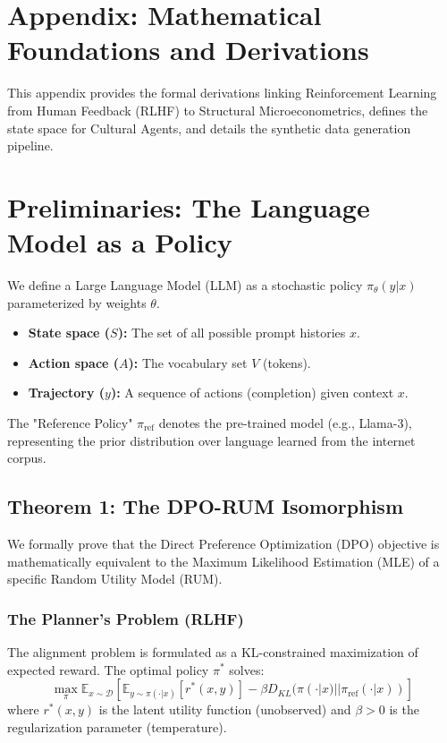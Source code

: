 \section*{Appendix: Mathematical Foundations and Derivations}

\noindent This appendix provides the formal derivations linking Reinforcement Learning from Human Feedback (RLHF) to Structural Microeconometrics, defines the state space for Cultural Agents, and details the synthetic data generation pipeline.

\section{Preliminaries: The Language Model as a Policy}
\label{app:gemini}

\renewcommand{\thesubsection}{\Alph{section}.\arabic{subsection}}
\setcounter{section}{1} %

We define a Large Language Model (LLM) as a stochastic policy $\pi_\theta(y|x)$ parameterized by weights $\theta$.
\begin{itemize}
    \item \textbf{State space ($S$):} The set of all possible prompt histories $x$.
    \item \textbf{Action space ($A$):} The vocabulary set $V$ (tokens).
    \item \textbf{Trajectory ($y$):} A sequence of actions (completion) given context $x$.
\end{itemize}
The "Reference Policy" $\pi_{\text{ref}}$ denotes the pre-trained model (e.g., Llama-3), representing the prior distribution over language learned from the internet corpus.

\subsection{Theorem 1: The DPO-RUM Isomorphism}
\label{proof:dpo_rum}

We formally prove that the Direct Preference Optimization (DPO) objective is mathematically equivalent to the Maximum Likelihood Estimation (MLE) of a specific Random Utility Model (RUM).

\subsubsection{The Planner's Problem (RLHF)}
The alignment problem is formulated as a KL-constrained maximization of expected reward. The optimal policy $\pi^*$ solves:
\begin{equation}
    \max_{\pi} \mathbb{E}_{x \sim \mathcal{D}} \left[ \mathbb{E}_{y \sim \pi(\cdot|x)} [r^*(x, y)] - \beta D_{KL}(\pi(\cdot|x) || \pi_{\text{ref}}(\cdot|x)) \right]
    \label{eq:objective}
\end{equation}
where $r^*(x,y)$ is the latent utility function (unobserved) and $\beta > 0$ is the regularization parameter (temperature).

